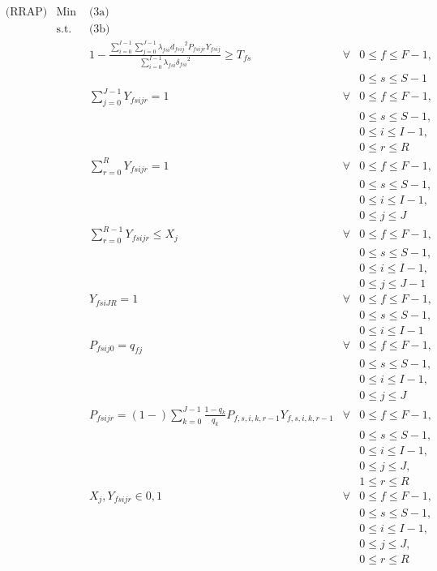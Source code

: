 \documentclass[11pt,]{article}
\begin{document}
\begin{align*}
& \text{(RRAP)} & \text{Min } & \text{(3a)}\\
%
& & \text{s.t. } & \text{(3b)}\\
%
& & & 1 - \frac{\sum_{i=0}^{I-1} \sum_{j=0}^{J-1} \lambda_{fsi} {d_{fsij}}^{2} P_{fsijr} Y_{fsij}}{\sum_{i=0}^{I-1} \lambda_{fsi} {\delta_{fsi}}^{2}} \geq T_{fs}  & \forall & 0 \leq f \leq F-1, \tag*{eqn 8a}\\
& & & & & 0 \leq s \leq S-1\\
%
& & & \sum_{j=0}^{J-1} Y_{fsijr} = 1 & \forall & 0 \leq f \leq F-1, \tag*{eqn 8b}\\
& & & & & 0 \leq s \leq S-1,\\
& & & & & 0 \leq i \leq I-1,\\
& & & & & 0 \leq r \leq R\\
%
& & & \sum_{r=0}^{R} Y_{fsijr} = 1 & \forall & 0 \leq f \leq F-1, \tag*{eqn 8c}\\
& & & & & 0 \leq s \leq S-1,\\
& & & & & 0 \leq i \leq I-1,\\
& & & & & 0 \leq j \leq J\\
%
& & & \sum_{r=0}^{R-1} Y_{fsijr} \leq X_j & \forall & 0 \leq f \leq F-1, \tag*{eqn 8d}\\
& & & & & 0 \leq s \leq S-1,\\
& & & & & 0 \leq i \leq I-1,\\
& & & & & 0 \leq j \leq J-1\\
%
& & & Y_{fsiJR} = 1 & \forall & 0 \leq f \leq F-1, \tag*{eqn 8e}\\
& & & & & 0 \leq s \leq S-1,\\
& & & & & 0 \leq i \leq I-1\\
%
& & & P_{fsij0} = q_{fj} & \forall & 0 \leq f \leq F-1, \tag*{eqn 8f}\\
& & & & & 0 \leq s \leq S-1,\\
& & & & & 0 \leq i \leq I-1,\\
& & & & & 0 \leq j \leq J\\
%
& & & P_{fsijr} = \left(1 - \right) \sum_{k=0}^{J-1} \frac{1 - q_k}{q_k} P_{f,s,i,k,r-1} Y_{f,s,i,k,r-1}  & \forall & 0 \leq f \leq F-1, \tag*{eqn 8g}\\
& & & & & 0 \leq s \leq S-1,\\
& & & & & 0 \leq i \leq I-1,\\
& & & & & 0 \leq j \leq J,\\
& & & & & 1 \leq r \leq R\\
%
& & & X_j, Y_{fsijr} \in {0,1} & \forall & 0 \leq f \leq F-1, \tag*{eqn 8h}\\
& & & & & 0 \leq s \leq S-1,\\
& & & & & 0 \leq i \leq I-1,\\
& & & & & 0 \leq j \leq J,\\
& & & & & 0 \leq r \leq R\\
\end{align*}
\end{document}
